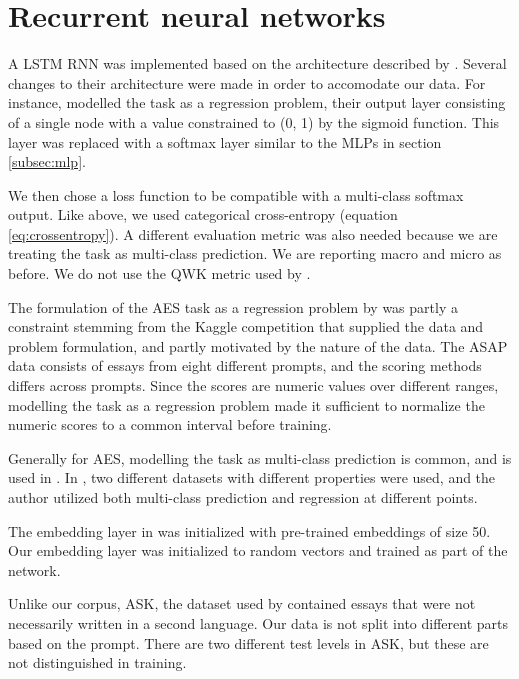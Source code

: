 \section{Recurrent neural networks}

A \ac{LSTM} \ac{RNN} was implemented based on the architecture described by
\textcite{taghipour16}. Several changes to their architecture were made in
order to accomodate our data. For instance, \citeauthor{taghipour16} modelled
the task as a regression problem, their output layer consisting of a single
node with a value constrained to (0, 1) by the sigmoid function. This layer
was replaced with a softmax layer similar to the \acp{MLP} in section
\ref{subsec:mlp}.

We then chose a loss function to be compatible with a multi-class softmax
output. Like above, we used categorical cross-entropy (equation
\ref{eq:crossentropy}). A different evaluation metric was also needed because
we are treating the task as multi-class prediction. We are reporting macro
and micro \FI as before. We do not use the \ac{QWK} metric used by
\citeauthor{taghipour16}. 

The formulation of the \ac{AES} task as a regression problem by
\citeauthor{taghipour16} was partly a constraint stemming from the Kaggle
competition that supplied the data and problem formulation, and partly
motivated by the nature of the data. The ASAP data consists of essays from
eight different prompts, and the scoring methods differs across prompts.
Since the scores are numeric values over different ranges, modelling the task
as a regression problem made it sufficient to normalize the numeric scores to
a common interval before training.

Generally for \ac{AES}, modelling the task as multi-class prediction is
common, and is used in \autocite{vajjala18universalCEFR}. In
\autocite{vajjala17}, two different datasets with different properties were
used, and the author utilized both multi-class prediction and regression at
different points.

The embedding layer in \textcite{taghipour16} was initialized with
pre-trained embeddings of size 50. Our embedding layer was initialized to
random vectors and trained as part of the network.

Unlike our corpus, ASK, the dataset used by \citeauthor{taghipour16}
contained essays that were not necessarily written in a second language. Our
data is not split into different parts based on the prompt. There are two
different test levels in ASK, but these are not distinguished in training.

